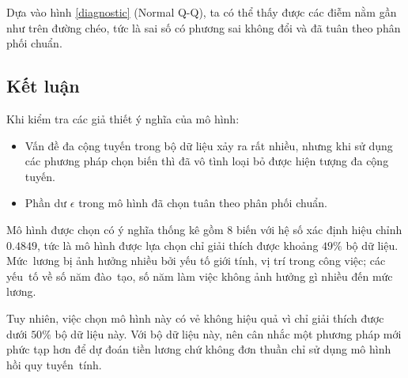 Dựa vào hình \ref{diagnostic} (Normal Q-Q), ta có thể thấy được các điễm nằm gần như trên đường chéo, tức là sai số có phương sai không đổi và đã tuân theo phân phối chuẩn.

\subsection*{Kết luận}
Khi kiểm tra các giả thiết ý nghĩa của mô hình:
\begin{itemize}
	\item Vấn đề đa cộng tuyến trong bộ dữ liệu xảy ra rất nhiều, nhưng khi sử dụng các phương pháp chọn biến thì đã vô tình loại bỏ được hiện tượng đa cộng tuyến.
	\item Phần dư $\epsilon$ trong mô hình đã chọn tuân theo phân phối chuẩn.
\end{itemize}

Mô hình được chọn có ý nghĩa thống kê gồm 8 biến với hệ số xác định hiệu chỉnh $0.4849$, tức là mô hình được lựa chọn chỉ giải thích được khoảng $49\%$ bộ dữ liệu. Mức~lương bị ảnh hưởng nhiều bởi yếu tố giới tính, vị trí trong công việc; các yếu~tố về số năm đào~tạo, số năm làm việc không ảnh hưởng gì nhiều đến mức lương.

Tuy nhiên, việc chọn mô hình này có vẻ không hiệu quả vì chỉ giải thích được dưới $50\%$ bộ dữ liệu này. Với bộ dữ liệu này, nên cân nhắc một phương pháp mới phức tạp hơn để dự đoán tiền lương chứ không đơn thuần chỉ sử dụng mô hình hồi quy tuyến~tính.
